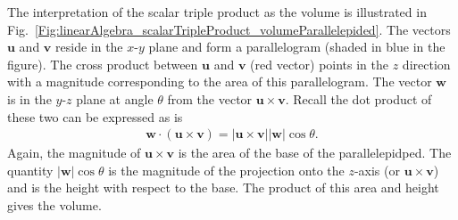 The interpretation of the scalar triple product as the volume is illustrated in Fig.~\ref{Fig:linearAlgebra_scalarTripleProduct_volumeParallelepided}. The vectors $\mathbf{u}$ and $\mathbf{v}$ reside in the $x$-$y$ plane and form a parallelogram (shaded in blue in the figure). The cross product between $\mathbf{u}$ and $\mathbf{v}$ (red vector) points in the $z$ direction with a magnitude corresponding to the area of this parallelogram. The vector $\mathbf{w}$ is in the $y$-$z$ plane at angle $\theta$ from the vector $\mathbf{u} \times \mathbf{v}$. Recall the dot product of these two can be expressed as is
\begin{align}
   \mathbf{w} \cdot ( \mathbf{u} \times \mathbf{v} ) = | \mathbf{u} \times \mathbf{v} | | \mathbf{w} | \cos\theta .
\end{align}
Again, the magnitude of $\mathbf{u} \times \mathbf{v}$ is the area of the base of the parallelepidped. The quantity $| \mathbf{w} | \cos\theta$ is the magnitude of the projection onto the $z$-axis (or $\mathbf{u} \times \mathbf{v}$) and is the height with respect to the base. The product of this area and height gives the volume.

